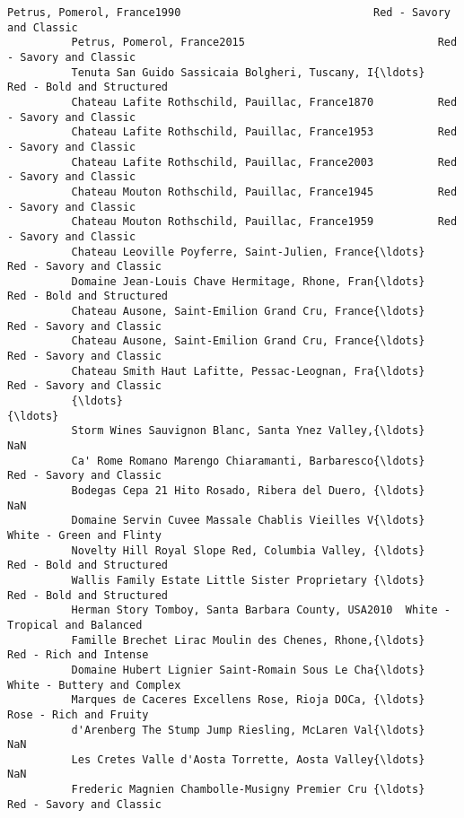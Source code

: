 \documentclass[11pt]{article}
\begin{document}
\begin{Verbatim}[commandchars=\\\{\}]
          Petrus, Pomerol, France1990                              Red - Savory and Classic   
          Petrus, Pomerol, France2015                              Red - Savory and Classic   
          Tenuta San Guido Sassicaia Bolgheri, Tuscany, I{\ldots}      Red - Bold and Structured   
          Chateau Lafite Rothschild, Pauillac, France1870          Red - Savory and Classic   
          Chateau Lafite Rothschild, Pauillac, France1953          Red - Savory and Classic   
          Chateau Lafite Rothschild, Pauillac, France2003          Red - Savory and Classic   
          Chateau Mouton Rothschild, Pauillac, France1945          Red - Savory and Classic   
          Chateau Mouton Rothschild, Pauillac, France1959          Red - Savory and Classic   
          Chateau Leoville Poyferre, Saint-Julien, France{\ldots}       Red - Savory and Classic   
          Domaine Jean-Louis Chave Hermitage, Rhone, Fran{\ldots}      Red - Bold and Structured   
          Chateau Ausone, Saint-Emilion Grand Cru, France{\ldots}       Red - Savory and Classic   
          Chateau Ausone, Saint-Emilion Grand Cru, France{\ldots}       Red - Savory and Classic   
          Chateau Smith Haut Lafitte, Pessac-Leognan, Fra{\ldots}       Red - Savory and Classic   
          {\ldots}                                                                           {\ldots}   
          Storm Wines Sauvignon Blanc, Santa Ynez Valley,{\ldots}                            NaN   
          Ca' Rome Romano Marengo Chiaramanti, Barbaresco{\ldots}       Red - Savory and Classic   
          Bodegas Cepa 21 Hito Rosado, Ribera del Duero, {\ldots}                            NaN   
          Domaine Servin Cuvee Massale Chablis Vieilles V{\ldots}       White - Green and Flinty   
          Novelty Hill Royal Slope Red, Columbia Valley, {\ldots}      Red - Bold and Structured   
          Wallis Family Estate Little Sister Proprietary {\ldots}      Red - Bold and Structured   
          Herman Story Tomboy, Santa Barbara County, USA2010  White - Tropical and Balanced   
          Famille Brechet Lirac Moulin des Chenes, Rhone,{\ldots}         Red - Rich and Intense   
          Domaine Hubert Lignier Saint-Romain Sous Le Cha{\ldots}    White - Buttery and Complex   
          Marques de Caceres Excellens Rose, Rioja DOCa, {\ldots}         Rose - Rich and Fruity   
          d'Arenberg The Stump Jump Riesling, McLaren Val{\ldots}                            NaN   
          Les Cretes Valle d'Aosta Torrette, Aosta Valley{\ldots}                            NaN   
          Frederic Magnien Chambolle-Musigny Premier Cru {\ldots}       Red - Savory and Classic   

\end{Verbatim}
\end{document}
